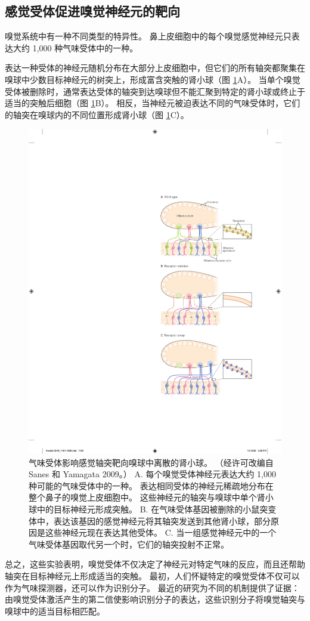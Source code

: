 \subsection{感觉受体促进嗅觉神经元的靶向}

嗅觉系统中有一种不同类型的特异性。
鼻上皮细胞中的每个嗅觉感觉神经元只表达大约 1,000 种气味受体中的一种。

表达一种受体的神经元随机分布在大部分上皮细胞中，但它们的所有轴突都聚集在嗅球中少数目标神经元的树突上，形成富含突触的肾小球（图 \ref{fig:48_3}A）。
当单个嗅觉受体被删除时，通常表达受体的轴突到达嗅球但不能汇聚到特定的肾小球或终止于适当的突触后细胞（图 \ref{fig:48_3}B）。
相反，当神经元被迫表达不同的气味受体时，它们的轴突在嗅球内的不同位置形成肾小球（图 \ref{fig:48_3}C）。


\begin{figure}[htbp]
	\centering
	\includegraphics[width=0.5\linewidth]{chap48/fig_48_3}
	\caption{气味受体影响感觉轴突靶向嗅球中离散的肾小球。 （经许可改编自 Sanes 和 Yamagata 2009。） A. 每个嗅觉受体神经元表达大约 1,000 种可能的气味受体中的一种。 表达相同受体的神经元稀疏地分布在整个鼻子的嗅觉上皮细胞中。 这些神经元的轴突与嗅球中单个肾小球中的目标神经元形成突触。 B. 在气味受体基因被删除的小鼠突变体中，表达该基因的感觉神经元将其轴突发送到其他肾小球，部分原因是这些神经元现在表达其他受体。 C. 当一组感觉神经元中的一个气味受体基因取代另一个时，它们的轴突投射不正常。}
	\label{fig:48_3}
\end{figure}


总之，这些实验表明，嗅觉受体不仅决定了神经元对特定气味的反应，而且还帮助轴突在目标神经元上形成适当的突触。
最初，人们怀疑特定的嗅觉受体不仅可以作为气味探测器，还可以作为识别分子。
最近的研究为不同的机制提供了证据：由嗅觉受体激活产生的第二信使影响识别分子的表达，这些识别分子将嗅觉轴突与嗅球中的适当目标相匹配。


